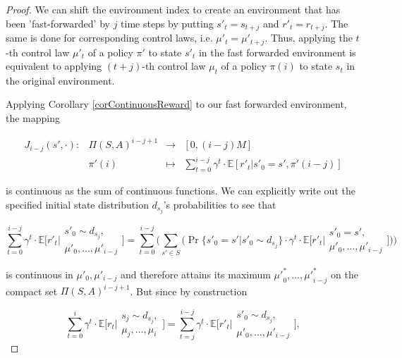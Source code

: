 \documentclass[11pt]{article} %
\begin{document}
\begin{proof}
We can shift the environment index to create an environment that has been 'fast-forwarded' by $j$ time steps by putting $s'_{t} = s_{t+j}$ and $r'_t = r_{t+j}$. The same is done for corresponding control laws, i.e. $\mu'_t = \mu'_{t + j}$. Thus, applying the $t$-th control law $\mu'_t$ of a policy $\pi'$ to state $s'_t$ in the fast forwarded environment is equivalent to applying $(t+j)$-th control law $\mu_t$ of a policy $\pi(i)$ to state $s_t$ in the original environment. 

Applying Corollary \ref{corContinuousReward} to our fast forwarded environment, the mapping 

\begin{equation}\label{contDiscExpRewSumMap}
	\begin{array}{rccl}
		J_{i-j}(s',\cdot): 	& \Pi(S,A)^{i-j+1} 	& \rightarrow 	& [0,(i-j) M] \\
					& \pi'(i)		& \mapsto 	& \sum\limits_{t=0}^{i-j} \gamma^t \cdot \mathbb{E}[ r'_t | s'_0 = s', \pi'(i-j)]
	\end{array}
\end{equation}

is continuous as the sum of continuous functions. We can explicitly write out the specified initial state distribution $d_{s_j}$'s probabilities to see that

\begin{equation}
	\sum\limits_{t=0}^{i-j} \gamma^t \cdot \mathbb{E} \Big[ r'_t \Big| \begin{array}{c}
																		s'_0 \sim d_{s_j}, \\
																		\mu'_0,\dots,\mu'_{i-j}
																	\end{array} \Big]  = \sum\limits_{t=0}^{i-j} \Big( \sum\limits_{s' \in S} \Big( \Pr\{ s'_0 = s' | s'_0 \sim d_{s_j}\} \cdot \gamma^t \cdot \mathbb{E} \Big[ r'_t \Big| \begin{array}{c}
																			s'_0 = s', \\
																			\mu'_0,\dots,\mu'_{i-j}
																		\end{array} \Big] \Big) \Big)
\end{equation}

is continuous in $\mu'_0,\mu'_{i-j}$ and therefore attains its maximum ${\mu'}^*_0,\dots,{\mu'}^*_{i-j}$ on the compact set $\Pi(S,A)^{i-j+1}$. But since by construction

\begin{equation}
	\sum\limits_{t=0}^i \gamma^t \cdot \mathbb{E} \Big[ r_t \Big| \begin{array}{c}
																		s_j \sim d_{s_j}, \\
																		\mu_j,\dots,\mu_i
																	\end{array} \Big]  = \sum\limits_{t=j}^{i-j} \gamma^t \cdot \mathbb{E} \Big[ r'_t \Big| \begin{array}{c}
																		s'_0 \sim d_{s_j}, \\
																		\mu'_0,\dots,\mu'_{i-j}
																	\end{array} \Big],
\end{equation}


\end{proof}
\end{document}

